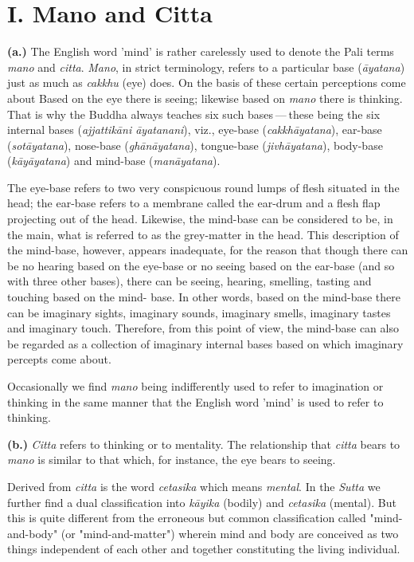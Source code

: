 \hypertarget{x-i.-mano-and-citta}{\section*{I. Mano and Citta}}
\textbf{(a.)} The English word 'mind' is rather carelessly used to denote the Pali
terms \emph{mano} and \emph{citta}. \emph{Mano}, in strict terminology, refers to a
particular base (\emph{āyatana}) just as much as \emph{cakkhu} (eye) does. On
the basis of these certain perceptions come about Based on the eye there
is seeing; likewise based on \emph{mano} there is thinking. That is why the
Buddha always teaches six such bases — these being the six internal
bases (\emph{ajjattikāni āyatanani}), viz., eye-base (\emph{cakkhāyatana}),
ear-base (\emph{sotāyatana}), nose-base (\emph{ghānāyatana}), tongue-base
(\emph{jivhāyatana}), body-base (\emph{kāyāyatana}) and mind-base
(\emph{manāyatana}).


The eye-base refers to two very conspicuous round lumps of flesh
situated in the head; the ear-base refers to a membrane called the
ear-drum and a flesh flap projecting out of the head. Likewise, the
mind-base can be considered to be, in the main, what is referred to as
the grey-matter in the head. This description of the mind-base, however,
appears inadequate, for the reason that though there can be no hearing
based on the eye-base or no seeing based on the ear-base (and so with
three other bases), there can be seeing, hearing, smelling, tasting and
touching based on the mind- base. In other words, based on the mind-base
there can be imaginary sights, imaginary sounds, imaginary smells,
imaginary tastes and imaginary touch. Therefore, from this point of
view, the mind-base can also be regarded as a collection of imaginary
internal bases based on which imaginary percepts come about.


Occasionally we find \emph{mano} being indifferently used to refer to
imagination or thinking in the same manner that the English word 'mind'
is used to refer to thinking.


\textbf{(b.)} \emph{Citta} refers to thinking or to mentality. The relationship that
\emph{citta} bears to \emph{mano} is similar to that which, for instance, the eye
bears to seeing.


Derived from \emph{citta} is the word \emph{cetasika} which means \emph{mental}. In
the \emph{Sutta} we further find a dual classification into \emph{kāyika} (bodily)
and \emph{cetasika} (mental). But this is quite different from the erroneous
but common classification called "mind-and-body" (or "mind-and-matter")
wherein mind and body are conceived as two things independent of each
other and together constituting the living individual.


